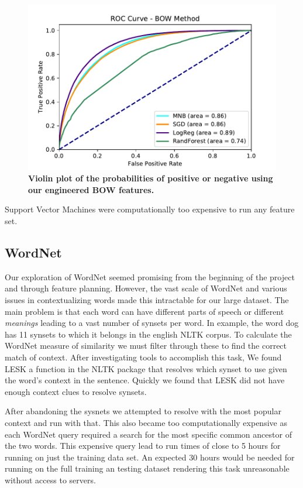 \documentclass{article} %
\begin{document}
\begin{figure}[]
	\centering
	\includegraphics[width=.49\textwidth]{roc}
	\caption{\textbf{Violin plot of the probabilities of positive or negative using our engineered BOW features.}}
	\label{fig:violin}
\end{figure}
 
 Support Vector Machines were computationally too expensive to run any feature set.
\subsection{WordNet} \label{sub:wnet_res}
Our exploration of WordNet seemed promising from the beginning of the project and through feature planning. However, the vast scale of WordNet and various issues in contextualizing words made this intractable for our large dataset. The main problem is that each word can have different parts of speech or different \textit{meanings} leading to a vast number of synsets per word. In example, the word dog has 11 synsets to which it belongs in the english NLTK corpus. To calculate the WordNet measure of similarity we must filter through these to find the correct match of context. After investigating tools to accomplish this task, We found LESK a function in the NLTK package that resolves which synset to use given the word's context in the sentence. Quickly we found that LESK did not have enough context clues to resolve synsets.

After abandoning the sysnets we attempted to resolve with the most popular context and run with that. This also became too computationally expensive as each WordNet query required a search for the most specific common ancestor of the two words. This expensive query lead to run times of close to 5 hours for running on just the training data set. An expected 30 hours would be needed for running on the full training an testing dataset rendering this task unreasonable without access to servers.

\end{document}
